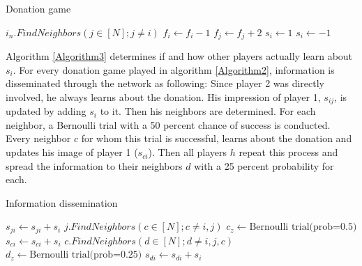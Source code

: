 \documentclass{JASSS}
\begin{document}
\begin{algorithm}
	\caption{Donation game}
	\label{Algorithm2}
	\begin{algorithmic}[1]
		\State $i_{n}.FindNeighbors(j\in[N];j\neq i)$
		\State $f_i \gets f_i-1$
		\State $f_j \gets f_j+2$
		\State $s_{i} \gets 1$
		\Else
		\State $s_{i} \gets -1$
		\EndIf
		\EndFor
		\EndFunction
	\end{algorithmic}
\end{algorithm}

Algorithm \ref{Algorithm3} determines if and how other players actually learn about $s_i$. For every donation game played in algorithm \ref{Algorithm2}, information is disseminated through the network as following: Since player 2 was directly involved, he always learns about the donation. His impression of player 1, $s_{ij}$, is updated by adding $s_i$ to it. Then his neighbors are determined. For each neighbor, a Bernoulli trial with a 50 percent chance of success is conducted. Every neighbor $c$ for whom this trial is successful, learns about the donation and updates his image of player 1 ($s_{ci}$). Then all players $h$ repeat this process and spread the information to their neighbors $d$ with a 25 percent probability for each.%

\begin{algorithm}
	\caption{Information dissemination}
	\label{Algorithm3}
	\begin{algorithmic}[1]
		\State $s_{ji} \gets s_{ji}+s_{i}$
		\State $j.FindNeighbors(c\in[N];c\neq i,j)$
		\State $c_z \gets \text{Bernoulli trial(prob=0.5)}$
		\State $s_{ci} \gets s_{ci}+s_{i}$
		\State $c.FindNeighbors(d\in[N];d\neq i,j,c)$
		\State $d_z \gets \text{Bernoulli trial(prob=0.25)}$
		\State $s_{di} \gets s_{di}+s_{i}$
		\EndIf
		\EndFor
		\EndIf
		\EndFor
		\EndFor
		\EndFunction
	\end{algorithmic}
\end{algorithm}
\end{document}

